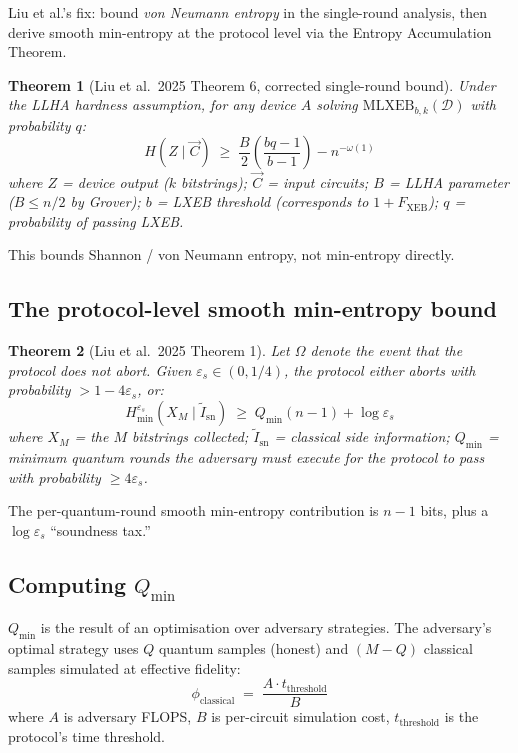 \documentclass[11pt,a4paper]{article}
\theoremstyle{plain}
\newtheorem{theorem}{Theorem}[section]
\theoremstyle{definition}
\theoremstyle{remark}
\newcommand{\Hsmin}[1][\varepsilon_s]{H^{#1}_{\min}}
\begin{document}
Liu et al.'s fix: bound \emph{von Neumann entropy} in the single-round analysis, then derive smooth min-entropy at the protocol level via the Entropy Accumulation Theorem.

\begin{theorem}[Liu et al.\ 2025 Theorem 6, corrected single-round bound]
Under the LLHA hardness assumption, for any device $A$ solving $\mathrm{MLXEB}_{b,k}(\mathcal{D})$ with probability $q$:
\begin{equation}
H(Z \mid \vec{C}) \;\geq\; \frac{B}{2}\!\left(\frac{bq - 1}{b - 1}\right) - n^{-\omega(1)}
\end{equation}
where $Z$ = device output ($k$ bitstrings); $\vec{C}$ = input circuits; $B$ = LLHA parameter ($B \leq n/2$ by Grover); $b$ = LXEB threshold (corresponds to $1 + F_{\mathrm{XEB}}$); $q$ = probability of passing LXEB.
\end{theorem}

This bounds Shannon / von Neumann entropy, not min-entropy directly.

\subsection{The protocol-level smooth min-entropy bound}

\begin{theorem}[Liu et al.\ 2025 Theorem 1]
\label{thm:liu-main}
Let $\Omega$ denote the event that the protocol does not abort. Given $\varepsilon_s \in (0, 1/4)$, the protocol either aborts with probability $> 1 - 4\varepsilon_s$, or:
\begin{equation}
\boxed{\Hsmin(X_M \mid \tilde{I}_{\mathrm{sn}}) \;\geq\; Q_{\min}(n-1) + \log \varepsilon_s}
\label{eq:liu-bound}
\end{equation}
where $X_M$ = the $M$ bitstrings collected; $\tilde{I}_{\mathrm{sn}}$ = classical side information; $Q_{\min}$ = minimum quantum rounds the adversary must execute for the protocol to pass with probability $\geq 4\varepsilon_s$.
\end{theorem}

The per-quantum-round smooth min-entropy contribution is $n-1$ bits, plus a $\log \varepsilon_s$ ``soundness tax.''

\subsection{Computing $Q_{\min}$}

$Q_{\min}$ is the result of an optimisation over adversary strategies. The adversary's optimal strategy uses $Q$ quantum samples (honest) and $(M-Q)$ classical samples simulated at effective fidelity:
\begin{equation}
\phi_{\mathrm{classical}} \;=\; \frac{A \cdot t_{\mathrm{threshold}}}{B}
\end{equation}
where $A$ is adversary FLOPS, $B$ is per-circuit simulation cost, $t_{\mathrm{threshold}}$ is the protocol's time threshold.
\end{document}
